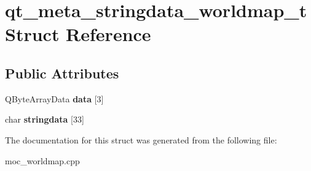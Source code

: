 \hypertarget{structqt__meta__stringdata__worldmap__t}{\section{qt\-\_\-meta\-\_\-stringdata\-\_\-worldmap\-\_\-t Struct Reference}
\label{structqt__meta__stringdata__worldmap__t}
}
\subsection*{Public Attributes}
\begin{DoxyCompactItemize}
\item 
\hypertarget{structqt__meta__stringdata__worldmap__t_a7f053666ef1690a4a6f61446cfade706}{Q\-Byte\-Array\-Data {\bfseries data} \mbox{[}3\mbox{]}}\label{structqt__meta__stringdata__worldmap__t_a7f053666ef1690a4a6f61446cfade706}

\item 
\hypertarget{structqt__meta__stringdata__worldmap__t_a1d1ac6d61c17f43deb7020712a1c3eca}{char {\bfseries stringdata} \mbox{[}33\mbox{]}}\label{structqt__meta__stringdata__worldmap__t_a1d1ac6d61c17f43deb7020712a1c3eca}

\end{DoxyCompactItemize}


The documentation for this struct was generated from the following file\-:\begin{DoxyCompactItemize}
\item 
moc\-\_\-worldmap.\-cpp\end{DoxyCompactItemize}
